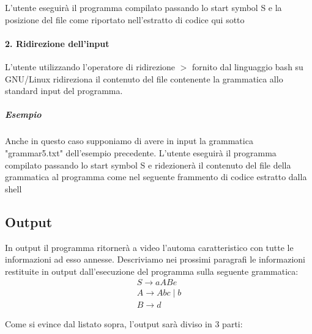 \documentclass[12pt]{article}
\begin{document}
L'utente eseguirà il programma compilato passando lo start symbol S e la posizione del file come riportato nell'estratto di codice qui sotto


\paragraph{2. Ridirezione dell'input}L'utente utilizzando l'operatore di ridirezione $>$ fornito dal linguaggio bash su GNU/Linux ridireziona il contenuto del file contenente la grammatica allo standard input del programma. 

\subparagraph{Esempio}
Anche in questo caso supponiamo di avere in input la grammatica "grammar5.txt" dell'esempio precedente. L'utente eseguirà il programma compilato passando lo start symbol S e ridezionerà il contenuto del file della grammatica al programma come nel seguente frammento di codice estratto dalla shell



\subsection{Output}
In output il programma ritornerà a video l'automa caratteristico con tutte le informazioni ad esso annesse. Descriviamo nei prossimi paragrafi le informazioni restituite in output dall'esecuzione del programma sulla seguente grammatica: 
\begin{align*}
    S \to aABe \\
	A \to Abc \mid b \\
	B \to d 
\end{align*}



Come si evince dal listato sopra, l'output sarà diviso in 3 parti:
\end{document}
